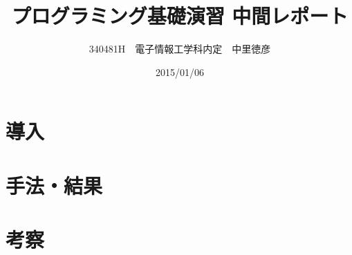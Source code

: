 \documentclass{jsarticle}
\title{プログラミング基礎演習 中間レポート}
\author{340481H　電子情報工学科内定　中里徳彦}
\date{2015/01/06}
\begin{document}
\maketitle

\section{導入}
\section{手法・結果}
\section{考察}
\end{document}
